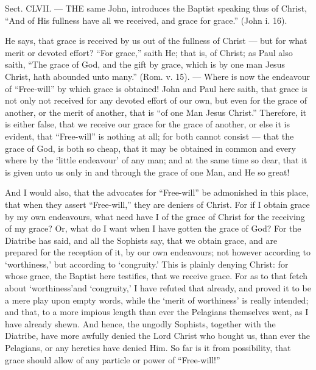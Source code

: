 
Sect. CLVII. — THE same John, introduces the Baptist speaking thus of Christ, “And of His fullness have all we received, and grace for grace.” (John i. 16).

He says, that grace is received by us out of the fullness of Christ — but for what merit or devoted effort? “For grace,” saith He; that is, of Christ; as Paul also saith, “The grace of God, and the gift by grace, which is by one man Jesus Christ, hath abounded unto many.” (Rom. v. 15). — Where is now the endeavour of “Free-will” by which grace is obtained! John and Paul here saith, that grace is not only not received for any devoted effort of our own, but even for the grace of another, or the merit of another, that is “of one Man Jesus Christ.” Therefore, it is either false, that we receive our grace for the grace of another, or else it is evident, that “Free-will” is nothing at all; for both cannot consist — that the grace of God, is both so cheap, that it may be obtained in common and every where by the ‘little endeavour’ of any man; and at the same time so dear, that it is given unto us only in and through the grace of one Man, and He so great!

And I would also, that the advocates for “Free-will” be admonished in this place, that when they assert “Free-will,” they are deniers of Christ. For if I obtain grace by my own endeavours, what need have I of the grace of Christ for the receiving of my grace? Or, what do I want when I have gotten the grace of God? For the Diatribe has said, and all the Sophists say, that we obtain grace, and are prepared for the reception of it, by our own endeavours; not however according to ‘worthiness,’ but according to ‘congruity.’ This is plainly denying Christ: for whose grace, the Baptist here testifies, that we receive grace. For as to that fetch about ‘worthiness’and ‘congruity,’ I have refuted that already, and proved it to be a mere play upon empty words, while the ‘merit of worthiness’ is really intended; and that, to a more impious length than ever the Pelagians themselves went, as I have already shewn. And hence, the ungodly Sophists, together with the Diatribe, have more awfully denied the Lord Christ who bought us, than ever the Pelagians, or any heretics have denied Him. So far is it from possibility, that grace should allow of any particle or power of “Free-will!”

